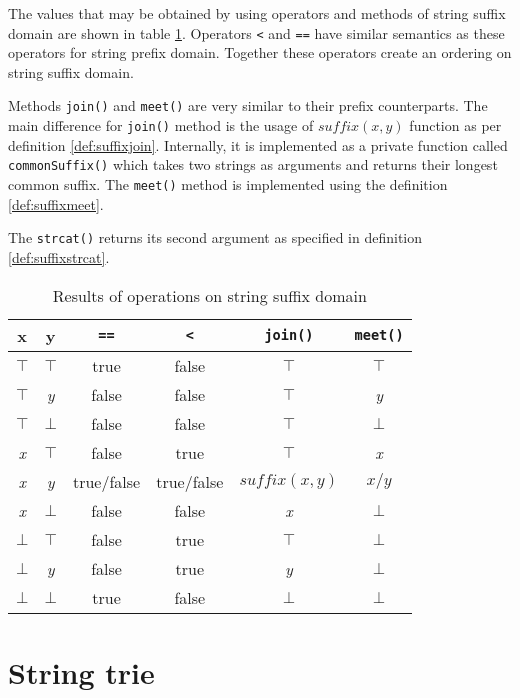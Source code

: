 \documentclass[12pt,final,oneside]{fithesis2}
\theoremstyle{definition}
\begin{document}
The values that may be obtained by using operators and methods of string suffix
domain are shown in table \ref{tab:suffixops}. Operators \texttt{<} and
\texttt{==} have similar semantics as these operators for string prefix domain.
Together these operators create an ordering on string suffix domain.

Methods \texttt{join()} and \texttt{meet()} are very similar to their prefix
counterparts. The main difference for \texttt{join()} method is the usage of
$\textit{suffix}(x, y)$ function as per definition \ref{def:suffixjoin}.
Internally, it is implemented as a private function called
\texttt{commonSuffix()} which takes two strings as arguments and returns their
longest common suffix. The \texttt{meet()} method is implemented using the
definition \ref{def:suffixmeet}.

The \texttt{strcat()} returns its second argument as specified in definition
\ref{def:suffixstrcat}.

\begin{table}[ht]
\centering
\begin{tabular}{c|c|c|c|c|c}
 x & y & \texttt{==} & \texttt{<} & \texttt{join()} & \texttt{meet()} \\
\hline
$\top$     & $\top$     & true       & false      & $\top$       & $\top$ \\
$\top$     & \textit{y} & false      & false      & $\top$       & \textit{y} \\
$\top$     & $\bot$     & false      & false      & $\top$       & $\bot$ \\
\textit{x} & $\top$     & false      & true       & $\top$       & \textit{x} \\
\textit{x} & \textit{y} & true/false & true/false & $\textit{suffix}(x, y)$ & $x/y$ \\
\textit{x} & $\bot$     & false      & false      & \textit{x}   & $\bot$ \\
$\bot$     & $\top$     & false      & true       & $\top$       & $\bot$ \\
$\bot$     & \textit{y} & false      & true       & \textit{y}   & $\bot$ \\
$\bot$     & $\bot$     & true       & false      & $\bot$       & $\bot$
\end{tabular}
\caption{Results of operations on string suffix domain}
\label{tab:suffixops}
\end{table}

\section{String trie}
\end{document}
